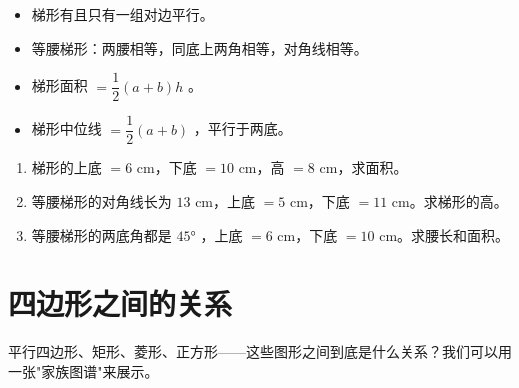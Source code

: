 \begin{keytakeaway}


\begin{itemize}
  \item 梯形有且只有一组对边平行。
  \item 等腰梯形：两腰相等，同底上两角相等，对角线相等。
  \item 梯形面积 $= \dfrac{1}{2}(a + b)h$ 。
  \item 梯形中位线 $= \dfrac{1}{2}(a + b)$ ，平行于两底。
\end{itemize}


\end{keytakeaway}

\begin{practice}


\begin{enumerate}
  \item 梯形的上底 $= 6$ cm，下底 $= 10$ cm，高 $= 8$ cm，求面积。
  \item 等腰梯形的对角线长为 $13$ cm，上底 $= 5$ cm，下底 $= 11$ cm。求梯形的高。
  \item 等腰梯形的两底角都是 $45°$ ，上底 $= 6$ cm，下底 $= 10$ cm。求腰长和面积。
\end{enumerate}


\end{practice}



\section*{四边形之间的关系}


\begin{explore}


平行四边形、矩形、菱形、正方形——这些图形之间到底是什么关系？我们可以用一张"家族图谱"来展示。

\end{explore}

